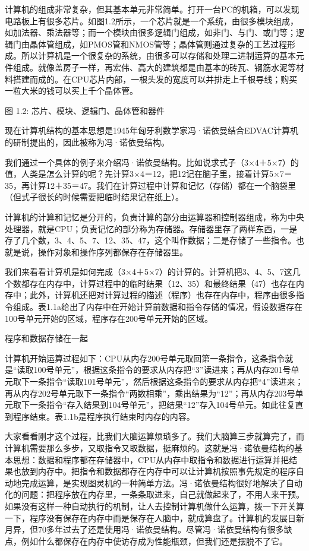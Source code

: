 \documentclass[]{ctexbook}
\begin{document}
计算机的组成非常复杂，但其基本单元非常简单。打开一台PC的机箱，可以发现电路板上有很多芯片。如图1.2所示，一个芯片就是一个系统，由很多模块组成，如加法器、乘法器等；而一个模块由很多逻辑门组成，如非门、与门、或门等；逻辑门由晶体管组成，如PMOS管和NMOS管等；晶体管则通过复杂的工艺过程形成。所以计算机是一个很复杂的系统，由很多可以存储和处理二进制运算的基本元件组成。就像盖房子一样，再宏伟、高大的建筑都是由基本的砖瓦、钢筋水泥等材料搭建而成的。在CPU芯片内部，一根头发的宽度可以并排走上千根导线；购买一粒大米的钱可以买上千个晶体管。

图 1.2: 芯片、模块、逻辑门、晶体管和器件

现在计算机结构的基本思想是1945年匈牙利数学家冯·诺依曼结合EDVAC计算机的研制提出的，因此被称为冯·诺依曼结构。

我们通过一个具体的例子来介绍冯·诺依曼结构。比如说求式子（3×4＋5×7）的值，人类是怎么计算的呢？先计算3×4＝12，把12记在脑子里，接着计算5×7＝35，再计算12＋35＝47。我们在计算过程中计算和记忆（存储）都在一个脑袋里（但式子很长的时候需要把临时结果记在纸上）。

计算机的计算和记忆是分开的，负责计算的部分由运算器和控制器组成，称为中央处理器，就是CPU；负责记忆的部分称为存储器。存储器里存了两样东西，一是存了几个数，3、4、5、7、12、35、47，这个叫作数据；二是存储了一些指令。也就是说，操作对象和操作序列都保存在存储器里。

我们来看看计算机是如何完成（3×4＋5×7）的计算的。计算机把3、4、5、7这几个数都存在内存中，计算过程中的临时结果（12、35）和最终结果（47）也存在内存中；此外，计算机还把对计算过程的描述（程序）也存在内存中，程序由很多指令组成。表1.1a给出了内存中在开始计算前数据和指令存储的情况，假设数据存在100号单元开始的区域，程序存在200号单元开始的区域。

\label{tab:program-and-data}程序和数据存储在一起

计算机开始运算过程如下：CPU从内存200号单元取回第一条指令，这条指令就是``读取100号单元''，根据这条指令的要求从内存把``3''读进来；再从内存201号单元取下一条指令``读取101号单元''，然后根据这条指令的要求从内存把``4''读进来；再从内存202号单元取下一条指令``两数相乘''，乘出结果为``12''；再从内存203号单元取下一条指令``存入结果到104号单元''，把结果``12''存入104号单元。如此往复直到程序结束。表1.1b是程序执行结束时内存的内容。

大家看看刚才这个过程，比我们大脑运算烦琐多了。我们大脑算三步就算完了，而计算机需要那么多步，又取指令又取数据，挺麻烦的。这就是冯·诺依曼结构的基本思想：数据和程序都在存储器中，CPU从内存中取指令和数据进行运算并把结果也放到内存中。把指令和数据都存在内存中可以让计算机按照事先规定的程序自动地完成运算，是实现图灵机的一种简单方法。冯·诺依曼结构很好地解决了自动化的问题：把程序放在内存里，一条条取进来，自己就做起来了，不用人来干预。如果没有这样一种自动执行的机制，让人去控制计算机做什么运算，拨一下开关算一下，程序没有保存在内存中而是保存在人脑中，就成算盘了。计算机的发展日新月异，但70多年过去了还是使用冯·诺依曼结构。尽管冯·诺依曼结构有很多缺点，例如什么都保存在内存中使访存成为性能瓶颈，但我们还是摆脱不了它。
\end{document}
